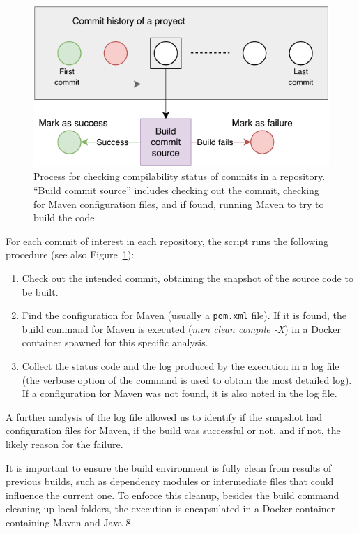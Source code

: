 \begin{figure}[t]
\centering    
\includegraphics[width=\textwidth]{pages/01-Buildability/images/AnalysisProcess.pdf}
\caption{Process for checking compilability status of commits in a repository. ``Build commit source'' includes checking out the commit, checking for Maven configuration files, and if found, running Maven to try to build the code.}
\label{fig:commitHist}
\end{figure}

For each commit of interest in each repository, the script runs the following procedure (see also Figure~\ref{fig:commitHist}):
\begin{enumerate}
\item Check out the intended commit, obtaining the snapshot of the source code to be built.
\item Find the configuration for Maven (usually a \verb|pom.xml| file). If it is found, the build command for Maven is executed (\textit{mvn clean compile -X}) in a Docker container spawned for this specific analysis.
\item Collect the status code and the log produced by the execution in a log file (the verbose option of the command is used to obtain the most detailed log). If a configuration for Maven was not found, it is also noted in the log file.
\end{enumerate}

A further analysis of the log file allowed us to identify if the snapshot had configuration files for Maven, if the build was successful or not, and if not, the likely reason for the failure.

It is important to ensure the build environment is fully clean from results of previous builds, such as dependency modules or intermediate files that could influence the current one. To enforce this cleanup, besides the build command cleaning up local folders, the execution is encapsulated in a Docker container containing Maven and Java 8.

